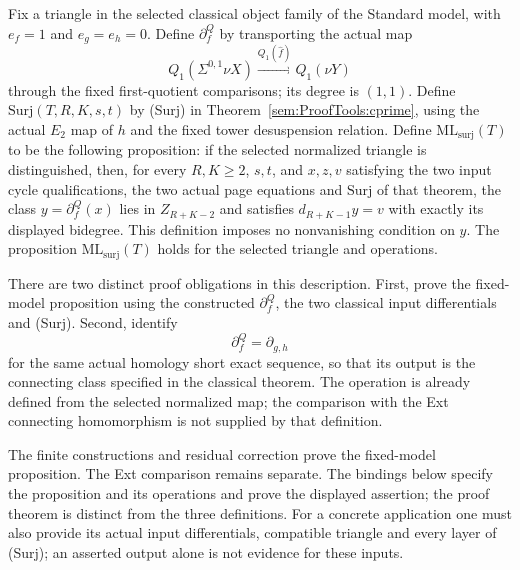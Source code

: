 \begin{proposition}
\label{sem:ProofTools:cprime-model}
Fix a triangle in the selected classical object family of the Standard
model, with $e_f=1$ and $e_g=e_h=0$.
Define $\partial^{Q}_{f}$ by transporting the actual map
\[
Q_1(\Sigma^{0,1}\nu X)\xrightarrow{Q_1(\widehat f)}Q_1(\nu Y)
\]
through the fixed first-quotient comparisons; its degree is $(1,1)$.
Define $\mathrm{Surj}(T,R,K,s,t)$ by (Surj) in
Theorem~\ref{sem:ProofTools:cprime}, using the actual $E_2$ map of $h$
and the fixed tower desuspension relation.
Define $\mathrm{ML}_{\mathrm{surj}}(T)$ to be the following proposition:
if the selected normalized triangle is distinguished, then, for every
$R,K\geq2$, $s,t$, and $x,z,v$ satisfying the two input cycle
qualifications, the two actual page equations and $\mathrm{Surj}$ of
that theorem, the class $y=\partial^Q_f(x)$ lies in $Z_{R+K-2}$ and
satisfies $d_{R+K-1}y=v$ with exactly its displayed bidegree.
This definition imposes no nonvanishing condition on $y$.
The proposition $\mathrm{ML}_{\mathrm{surj}}(T)$ holds for the selected
triangle and operations.

There are two distinct proof obligations in this description.
First, prove the fixed-model proposition using the constructed
$\partial^Q_f$, the two classical input differentials and (Surj).
Second, identify
\[
\partial^Q_f=\partial_{g,h}
\]
for the same actual homology short exact sequence, so that its output
is the connecting class specified in the classical theorem.
The operation is already defined from the selected normalized map;
the comparison with the Ext connecting homomorphism is not supplied
by that definition.

The finite constructions and residual correction prove the fixed-model
proposition. The Ext comparison remains separate. The bindings below
specify the proposition and its operations and prove the displayed
assertion; the proof theorem is distinct from the three definitions.
For a concrete application one must also provide its
actual input differentials, compatible triangle and every layer of
(Surj); an asserted output alone is not evidence for these inputs.
\end{proposition}
